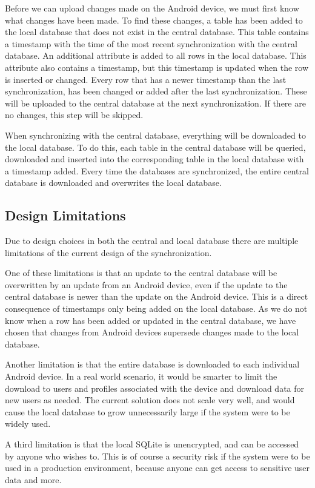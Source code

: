 Before we can upload changes made on the Android device, we must first know what changes have been made. To find these changes, a table has been added to the local database that does not exist in the central database. This table contains a timestamp with the time of the most recent synchronization with the central database. An additional attribute is added to all rows in the local database. This attribute also contains a timestamp, but this timestamp is updated when the row is inserted or changed. Every row that has a newer timestamp than the last synchronization, has been changed or added after the last synchronization. These will be uploaded to the central database at the next synchronization. If there are no changes, this step will be skipped.

When synchronizing with the central database, everything will be downloaded to the local database. To do this, each table in the central database will be queried, downloaded and inserted into the corresponding table in the local database with a timestamp added. Every time the databases are synchronized, the entire central database is downloaded and overwrites the local database.

\subsection{Design Limitations}
Due to design choices in both the central and local database there are multiple limitations of the current design of the synchronization.

One of these limitations is that an update to the central database will be overwritten by an update from an Android device, even if the update to the central database is newer than the update on the Android device. This is a direct consequence of timestamps only being added on the local database. As we do not know when a row has been added or updated in the central database, we have chosen that changes from Android devices supersede changes made to the local database.

Another limitation is that the entire database is downloaded to each individual Android device. In a real world scenario, it would be smarter to limit the download to users and profiles associated with the device and download data for new users as needed. The current solution does not scale very well, and would cause the local database to grow unnecessarily large if the system were to be widely used.

A third limitation is that the local SQLite is unencrypted, and can be accessed by anyone who wishes to. This is of course a security risk if the system were to be used in a production environment, because anyone can get access to sensitive user data and more.